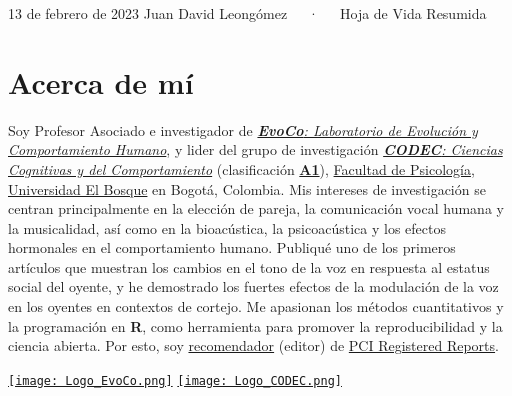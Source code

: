\documentclass[11pt,a4paper,]{awesome-cv}
\begin{document}
\makecvheader

\makecvfooter
  {13 de febrero de 2023}
    {Juan David Leongómez~~~·~~~Hoja de Vida Resumida}
  {\thepage}





\hypertarget{acerca-de-muxed}{%
\section{Acerca de mí}\label{acerca-de-muxed}}

\begin{minipage}[c]{0.85\linewidth}
Soy Profesor Asociado e investigador de \href{https://jdleongomez.info/es/team/}{\textit{\textbf{EvoCo}: Laboratorio de Evolución y Comportamiento Humano}}, y lider del grupo de investigación \href{https://investigaciones.unbosque.edu.co/codec}{\textit{\textbf{CODEC}: Ciencias Cognitivas y del Comportamiento}} (clasificación  \href{https://scienti.minciencias.gov.co/gruplac/jsp/visualiza/visualizagr.jsp?nro=00000000001446}{\textbf{A1}}),  \href{https://www.uelbosque.edu.co/psicologia}{Facultad de Psicología}, \href{https://www.uelbosque.edu.co/}{Universidad El Bosque} en Bogotá, Colombia. Mis intereses de investigación se centran principalmente en la elección de pareja, la comunicación vocal humana y la musicalidad, así como en la bioacústica, la psicoacústica y los efectos hormonales en el comportamiento humano. Publiqué uno de los primeros artículos que muestran los cambios en el tono de la voz en respuesta al estatus social del oyente, y he demostrado los fuertes efectos de la modulación de la voz en los oyentes en contextos de cortejo. Me apasionan los métodos cuantitativos y la programación en \textbf{R}, como herramienta para promover la reproducibilidad y la ciencia abierta. Por esto, soy \href{https://rr.peercommunityin.org/about/recommenders}{recomendador} (editor) de \href{https://rr.peercommunityin.org/}{PCI Registered Reports}.
\end{minipage} \begin{minipage}[c]{0.15\linewidth}
\begin{flushright} 
\hfill \href{https://jdleongomez.info/es/team/}{\texttt{[image: Logo\_EvoCo.png]}} \newline \href{https://investigaciones.unbosque.edu.co/codec}{\texttt{[image: Logo\_CODEC.png]}}
\end{flushright}
\end{minipage}
\end{document}
